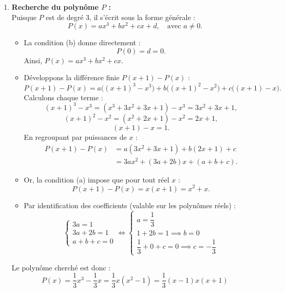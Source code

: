 \documentclass[11pt,a4paper]{article}
\begin{document}
\begin{correctionbox}
\begin{enumerate}
    \item \textbf{Recherche du polynôme $P$ :}\\
    Puisque $P$ est de degré $3$, il s'écrit sous la forme générale :
    \[
    P(x) = ax^3 + bx^2 + cx + d, \quad \text{avec } a \neq 0.
    \]
    \begin{itemize}[leftmargin=*,label=\textbullet]
        \item La condition (b) donne directement :
        \[
        P(0) = d = 0.
        \]
        Ainsi, $P(x) = ax^3 + bx^2 + cx$.
        \item Développons la différence finie $P(x+1) - P(x)$ :
        \[
        P(x+1) - P(x) = a\bigl((x+1)^3 - x^3\bigr) + b\bigl((x+1)^2 - x^2\bigr) + c\bigl((x+1) - x\bigr).
        \]
        Calculons chaque terme :
        \[
        (x+1)^3 - x^3 = (x^3 + 3x^2 + 3x + 1) - x^3 = 3x^2 + 3x + 1,
        \]
        \[
        (x+1)^2 - x^2 = (x^2 + 2x + 1) - x^2 = 2x + 1,
        \]
        \[
        (x+1) - x = 1.
        \]
        En regroupant par puissances de $x$ :
        \[
        \begin{aligned}
        P(x+1) - P(x) &= a(3x^2 + 3x + 1) + b(2x + 1) + c \\
        &= 3ax^2 + (3a + 2b)x + (a + b + c).
        \end{aligned}
        \]
        \item Or, la condition (a) impose que pour tout réel $x$ :
        \[
        P(x+1) - P(x) = x(x+1) = x^2 + x.
        \]
        \item Par identification des coefficients (valable sur les polynômes réels) :
        \[
        \begin{cases}
        3a = 1 \\[1mm]
        3a + 2b = 1 \\[1mm]
        a + b + c = 0
        \end{cases}
        \iff
        \begin{cases}
        a = \dfrac{1}{3} \\[2mm]
        1 + 2b = 1 \implies b = 0 \\[1mm]
        \dfrac{1}{3} + 0 + c = 0 \implies c = -\dfrac{1}{3}
        \end{cases}
        \]
    \end{itemize}
    Le polynôme cherché est donc :
    \[
    \boxed{P(x) = \frac{1}{3}x^3 - \frac{1}{3}x = \frac{1}{3}x(x^2 - 1) = \frac{1}{3}(x - 1)x(x + 1)}
    \]


\end{enumerate}
\end{correctionbox}
\end{document}
